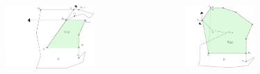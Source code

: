 \documentclass[aspectratio=169,xcolor=dvipsnames, t]{beamer}
\begin{document}
\begin{frame}
\begin{columns}
\begin{column}{0.33\textwidth}
\begin{figure}
          \centering
          \includegraphics[width=0.8\textwidth]{imagenes/Caso2.4b.png}
        \end{figure}
      \end{column}
      \begin{column}{0.33\textwidth}  %
        \begin{figure}
          \vspace{-1cm}
          \centering
          \includegraphics[width=0.6\textwidth]{imagenes/Caso2.5a.png}
        \end{figure}
      \end{column}
    \end{columns}
\end{frame}

\end{document}
